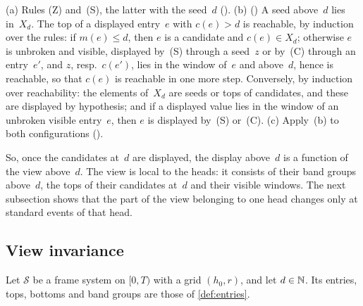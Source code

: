 \begin{outline}
(a) Rules (Z) and~(S), the latter with the seed~$d$ (). (b) () A seed above~$d$
lies in~$X_d$. The top of a displayed entry~$e$ with $c(e)>d$ is reachable, by induction over the rules: if $m(e)\le d$, then $e$
is a candidate and $c(e)\in X_d$; otherwise $e$ is unbroken and visible, displayed by~(S) through a seed~$z$ or by~(C) through an
entry~$e'$, and $z$, resp.\ $c(e')$, lies in the window of~$e$ and above~$d$, hence is reachable, so that $c(e)$ is reachable in one
more step. Conversely, by induction over reachability: the elements of~$X_d$ are seeds or tops of candidates, and these are
displayed by hypothesis; and if a displayed value lies in the window of an unbroken visible entry~$e$, then $e$ is displayed by~(S)
or~(C). (c) Apply~(b) to both configurations ().
\end{outline}

So, once the candidates at~$d$ are displayed, the display above~$d$ is a function of the view above~$d$. The view is local to the
heads: it consists of their band groups above~$d$, the tops of their candidates at~$d$ and their visible windows. The next
subsection shows that the part of the view belonging to one head changes only at standard events of that head.

\subsection{View invariance}\label{sec:displays-W}

Let $\mathcal S$ be a frame system on $[0,T)$ with a grid $(h_0,r)$, and let $d\in\mathbb{N}$. Its entries, tops, bottoms and band groups are those
of \cref{def:entries}.

